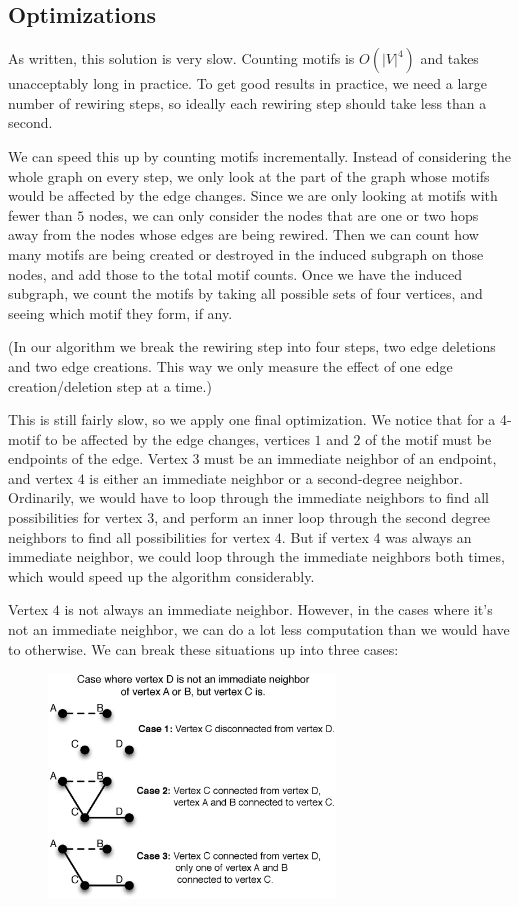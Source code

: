 \subsection{Optimizations}
As written, this solution is very slow.  Counting motifs is $O(|V|^4)$ and takes unacceptably long in practice.  To get good results in practice, we need a large number of rewiring steps, so ideally each rewiring step should take less than a second.

We can speed this up by counting motifs incrementally.  Instead of considering the whole graph on every step, we only look at the part of the graph whose motifs would be affected by the edge changes.  Since we are only looking at motifs with fewer than $5$ nodes, we can only consider the nodes that are one or two hops away from the nodes whose edges are being rewired.  Then we can count how many motifs are being created or destroyed in the induced subgraph on those nodes, and add those to the total motif counts.  Once we have the induced subgraph, we count the motifs by taking all possible sets of four vertices, and seeing which motif they form, if any.

(In our algorithm we break the rewiring step into four steps, two edge deletions and two edge creations.  This way we only measure the effect of one edge creation/deletion step at a time.)

This is still fairly slow, so we apply one final optimization.  We notice that for a 4-motif to be affected by the edge changes, vertices $1$ and $2$ of the motif must be endpoints of the edge.  Vertex $3$ must be an immediate neighbor of an endpoint, and vertex $4$ is either an immediate neighbor or a second-degree neighbor.  Ordinarily, we would have to loop through the immediate neighbors to find all possibilities for vertex $3$, and perform an inner loop through the second degree neighbors to find all possibilities for vertex $4$.  But if vertex $4$ was always an immediate neighbor, we could loop through the immediate neighbors both times, which would speed up the algorithm considerably.

Vertex $4$ is not always an immediate neighbor.  However, in the cases where it's not an immediate neighbor, we can do a lot less computation than we would have to otherwise.  We can break these situations up into three cases:

\begin{figure}
\centering
\includegraphics[width=3in]{Figures/case.eps}
\label{fig:case}
\end{figure}

